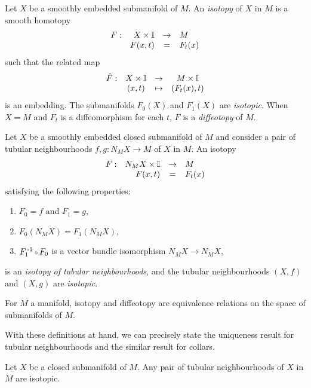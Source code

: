 \begin{defn}[Isotopy]
	\label{def:isotopy}
	Let $X$ be a smoothly embedded submanifold of $M$.
	An \emph{isotopy} of $X$ in $M$ is a smooth homotopy
	\[
		\begin{array}{crcl}
			F: & X\times \mathbb{I} & \to & M \\
			   & F(x,t) & = & F_t(x)
		\end{array}
	\]
	such that the related map
	\[
		\begin{array}{cccc}
			\hat{F}: & X\times\mathbb{I} & \to & M\times\mathbb{I} \\
					 & (x,t) & \mapsto & (F_t(x),t)
		\end{array}
	\]
	is an embedding.
	The submanifolds $F_0(X)$ and $F_1(X)$ are \emph{isotopic}.
	When $X=M$ and $F_t$ is a diffeomorphism for each $t$, $F$ is a \emph{diffeotopy} of $M$.
	
	Let $X$ be a smoothly embedded closed submanifold of $M$ and consider a pair of tubular neighbourhoods $f,g:N_M X\to M$ of $X$ in $M$.
	An isotopy
	\[
		\begin{array}{crcl}
			F: & N_M X\times\mathbb{I} & \to & M \\
			   & F(x,t) & = & F_t(x)
		\end{array}
	\]
	satisfying the following properties:
	\begin{enumerate}
		\item $F_0=f$ and $F_1=g$,
		\item $F_0(N_M X)=F_1(N_M X)$,
		\item $F_1\inv\comp F_0$ is a vector bundle isomorphism $N_M X\to N_M X$,
	\end{enumerate}
	 is an \emph{isotopy of tubular neighbourhoods}, and the tubular neighbourhoods $(X,f)$ and $(X,g)$ are \emph{isotopic}.
\end{defn}

\begin{prop}
	For $M$ a manifold, isotopy and diffeotopy are equivalence relations on the space of submanifolds of $M$.
\end{prop}

With these definitions at hand, we can precisely state the uniqueness result for tubular neighbourhoods and the similar result for collars.

\begin{theorem}
	\label{prop:uniquenesstubularneighbourhood}
	Let $X$ be a closed submanifold of $M$.
	Any pair of tubular neighbourhoods of $X$ in $M$ are isotopic.
\end{theorem}

